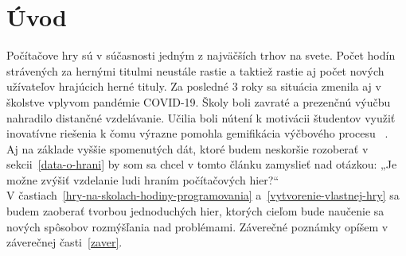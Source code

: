 \section{Úvod}
Počítačove hry sú v súčasnosti jedným z najväčších trhov na svete. Počet hodín strávených 
za hernými titulmi neustále rastie a taktiež rastie aj počet nových užívateľov hrajúcich 
herné tituly. Za posledné 3 roky sa situácia zmenila aj v školstve vplyvom pandémie COVID-19. Školy
boli zavraté a prezenčnú výučbu nahradilo distančné vzdelávanie. Učilia boli nútení k motivácii študentov využiť 
inovatívne riešenia k čomu výrazne pomohla gemifikácia výčbového procesu ~\cite{gemifikaciaPandemia, gemifikaciaNaSkole-1}.\\ 
Aj na základe vyššie spomenutých dát, ktoré budem neskoršie rozoberať v 
sekcii~\ref{data-o-hrani} by som sa chcel v tomto článku zamyslieť nad otázkou: 
„Je možne zvýšiť vzdelanie ludi hraním počítačových hier?“\\ 
V častiach~\ref{hry-na-skolach-hodiny-programovania} a~\ref{vytvorenie-vlastnej-hry} sa budem zaoberať 
tvorbou jednoduchých hier, ktorých cieľom bude naučenie sa nových spôsobov rozmýšľania nad problémami.
Záverečné poznámky opíšem v záverečnej časti~\ref{zaver}.